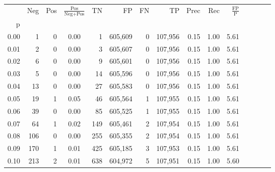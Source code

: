 \begin{tabular}{rrrcrrrrrrrrrrr}
\toprule
{} &     Neg &    Pos & $\frac{\text{Pos}}{\text{Neg}+\text{Pos}}$ &       TN &       FP &       FN &       TP &  Prec &   Rec & $\frac{\text{FP}}{\text{P}}$ \\
p    &         &        &                                            &          &          &          &          &       &       &                              \\
\midrule
0.00 &       1 &      0 &                                       0.00 &        1 &  605,609 &        0 &  107,956 &  0.15 &  1.00 &                         5.61 \\
0.01 &       2 &      0 &                                       0.00 &        3 &  605,607 &        0 &  107,956 &  0.15 &  1.00 &                         5.61 \\
0.02 &       6 &      0 &                                       0.00 &        9 &  605,601 &        0 &  107,956 &  0.15 &  1.00 &                         5.61 \\
0.03 &       5 &      0 &                                       0.00 &       14 &  605,596 &        0 &  107,956 &  0.15 &  1.00 &                         5.61 \\
0.04 &      13 &      0 &                                       0.00 &       27 &  605,583 &        0 &  107,956 &  0.15 &  1.00 &                         5.61 \\
0.05 &      19 &      1 &                                       0.05 &       46 &  605,564 &        1 &  107,955 &  0.15 &  1.00 &                         5.61 \\
0.06 &      39 &      0 &                                       0.00 &       85 &  605,525 &        1 &  107,955 &  0.15 &  1.00 &                         5.61 \\
0.07 &      64 &      1 &                                       0.02 &      149 &  605,461 &        2 &  107,954 &  0.15 &  1.00 &                         5.61 \\
0.08 &     106 &      0 &                                       0.00 &      255 &  605,355 &        2 &  107,954 &  0.15 &  1.00 &                         5.61 \\
0.09 &     170 &      1 &                                       0.01 &      425 &  605,185 &        3 &  107,953 &  0.15 &  1.00 &                         5.61 \\
0.10 &     213 &      2 &                                       0.01 &      638 &  604,972 &        5 &  107,951 &  0.15 &  1.00 &                         5.60 \\

\end{tabular}
